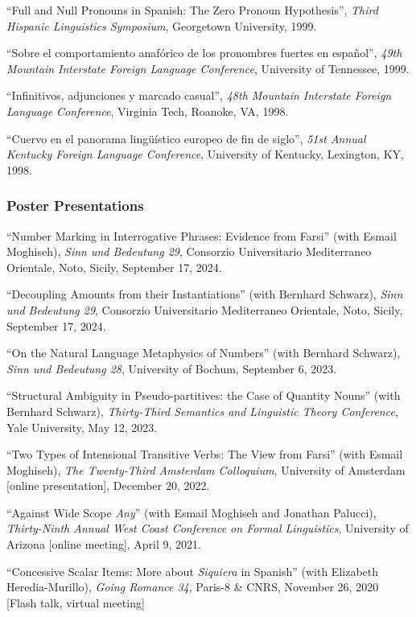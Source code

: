 \documentclass[11pt]{article}
\begin{document}
``Full and Null Pronouns in Spanish: The Zero Pronoun Hypothesis'', \textit{Third Hispanic Linguistics Symposium}, Georgetown University, 1999. 

``Sobre el comportamiento anaf\'orico de los pronombres fuertes en espa\~nol'', \textit{49th Mountain Interstate Foreign Language Conference}, University of Tennessee, 1999. 

``Infinitivos, adjunciones y marcado casual'', \textit{48th Mountain Interstate Foreign Language Conference}, Virginia Tech, Roanoke, VA, 1998. 

``Cuervo en el panorama ling\"{u}\'istico europeo de fin de siglo'', \textit{51st Annual Kentucky Foreign Language Conference}, University of Kentucky, Lexington, KY, 1998. 

\subsubsection*{Poster Presentations}


``Number Marking in Interrogative Phrases: Evidence from Farsi'' (with Esmail Moghiseh),
\textit{Sinn und Bedeutung 29}, Consorzio Universitario Mediterraneo Orientale, Noto, Sicily, September 17, 2024.

``Decoupling Amounts from their Instantiations'' (with Bernhard Schwarz), \textit{Sinn und Bedeutung 29}, Consorzio Universitario Mediterraneo Orientale, Noto, Sicily, September 17, 2024.

``On the Natural Language Metaphysics of Numbers'' (with Bernhard Schwarz), \textit{Sinn und Bedeutung 28}, University of Bochum, September 6, 2023.

``Structural Ambiguity in Pseudo-partitives:
the Case of Quantity Nouns'' (with Bernhard Schwarz), \textit{Thirty-Third Semantics and Linguistic Theory Conference}, Yale University, May 12, 2023.


``Two Types of Intensional Transitive Verbs: The View from Farsi'' (with Esmail Moghiseh), \textit{The Twenty-Third Amsterdam Colloquium}, University of Amsterdam [online presentation], December 20, 2022.

``Against Wide Scope \textit{Any}'' (with Esmail Moghiseh and Jonathan Palucci), \textit{Thirty-Ninth Annual West Coast Conference on Formal Linguistics}, University of Arizona [online meeting], April 9, 2021.

``Concessive Scalar Items: More about \textit{Siquiera} in Spanish'' (with Elizabeth Heredia-Murillo),
\textit{Going Romance 34}, Paris-8 \& CNRS, November 26, 2020 [Flash talk, virtual meeting]
\end{document}
